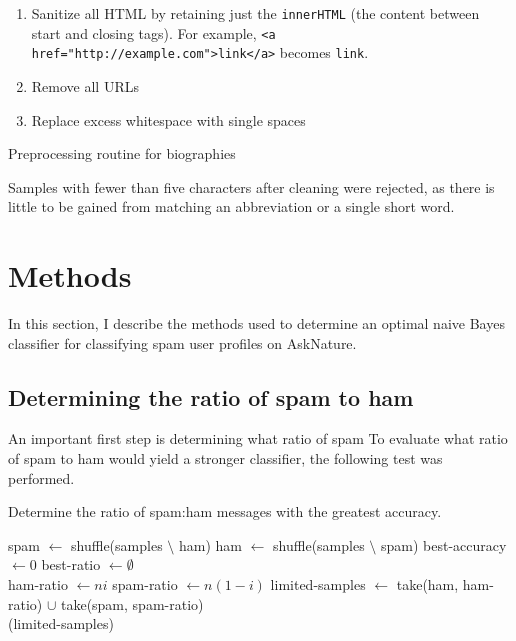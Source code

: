 \documentclass[10pt]{article}
\begin{document}
\begin{algorithm}
\begin{enumerate}
  \item Sanitize all HTML by retaining just the \texttt{innerHTML} (the
    content between start and closing tags). For example, \texttt{<a
      href="http://example.com">link</a>} becomes \texttt{link}.
  \item Remove all URLs
  \item Replace excess whitespace with single spaces
\end{enumerate}
\caption{Preprocessing routine for biographies}
\label{algo:preprocess}
\end{algorithm}

Samples with fewer than five characters after cleaning were rejected, as there
is little to be gained from matching an abbreviation or a single short word.

\section{Methods}

In this section, I describe the methods used to determine an optimal naive
Bayes classifier for classifying spam user profiles on AskNature.

\subsection{Determining the ratio of spam to ham}
An important first step is determining what ratio of spam
To evaluate what ratio of spam to ham would yield a stronger classifier, the
following test was performed.

\begin{algorithm}
  \caption{Determine the ratio of spam:ham messages with the greatest accuracy.}
  \begin{algorithmic}
  \State spam $\gets$ {\sc shuffle}(samples $\setminus $ ham)
  \State ham $\gets$ {\sc shuffle}(samples $\setminus $ spam)
  \State best-accuracy $\gets 0$
  \State best-ratio $\gets \emptyset$
  \\

  \State ham-ratio $\gets ni$
  \State spam-ratio $\gets n(1 - i)$
  \State limited-samples $\gets$ {\sc take}(ham, ham-ratio) $\cup$ {\sc take}(spam, spam-ratio)
  \\

  (limited-samples)

  \EndIf
  \EndFor
  \State {}
    \EndFunction
  \end{algorithmic}\label{algo}
\end{algorithm}
\end{document}
